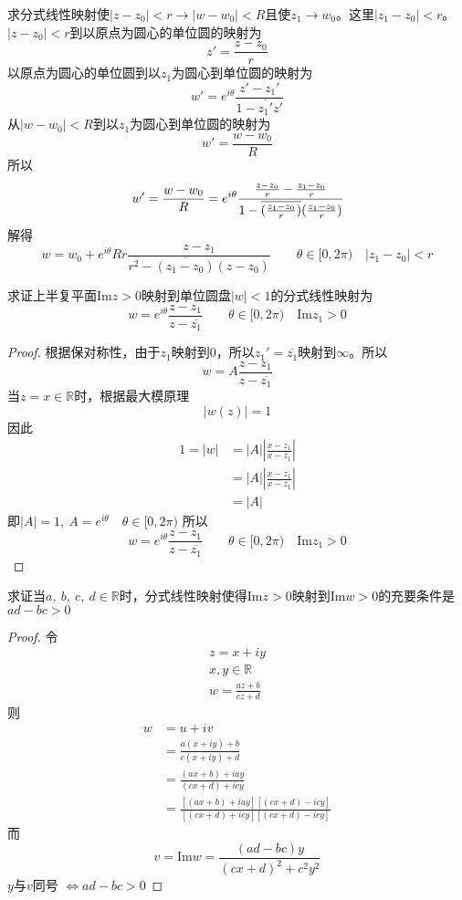 \begin{homeworkProblem}
求分式线性映射使$|z-z_0|<r\longrightarrow|w-w_0|<R$且使$z_1\rightarrow w_0$。这里$|z_1-z_0|<r$。
\newline
\solution
$|z-z_0|<r$到以原点为圆心的单位圆的映射为
\[
z' = \frac{z-z_0}{r}
\]
以原点为圆心的单位圆到以$z_1$为圆心到单位圆的映射为
\[
w' = e^{i\theta}\frac{z'-z_1'}{1-\overline{z_1'}z'}
\]
从$|w-w_0|<R$到以$z_1$为圆心到单位圆的映射为
\[
w' = \frac{w-w_0}{R}
\]
所以
\[
w' = \frac{w-w_0}{R} = e^{i\theta}\cfrac{\frac{z-z_0}{r} - \frac{z_1-z_0}{r}}
{1 - \overline{(\frac{z_1-z_0}{r})}(\frac{z_1-z_0}{r})}
\]
解得
\[
w = w_0 + e^{i\theta}Rr\frac{z-z_1}{r^2-\overline{(z_1-z_0)}(z-z_0)} \qquad \theta\in[0,2\pi)\quad|z_1-z_0|<r
\]
\end{homeworkProblem}
\begin{homeworkProblem}
求证上半复平面$\mathrm{Im}z>0$映射到单位圆盘$|w|<1$的分式线性映射为
\[
w = e^{i\theta}\frac{z-z_1}{z-\overline{z_1}}\qquad\theta\in[0,2\pi)\quad\mathrm{Im}z_1>0
\]
\begin{proof}
根据保对称性，由于$z_1$映射到$0$，所以$z_1' = \overline{z_1}$映射到$\infty$。所以
\[w=A\frac{z-z_1}{z-\overline{z_1}}\]
当$z=x\in\mathbb{R}$时，根据最大模原理\[|w(z)| = 1\]
因此
\[
\begin{split}
1 = |w| &= |A|\left|\frac{x-z_1}{x-\overline{z_1}}\right| \\
&= |A|\left|\frac{x-z_1}{\overline{x-z_1}}\right| \\
&= |A|
\end{split}
\]
即$|A|=1,~A=e^{i\theta}\quad\theta\in[0,2\pi)$
所以
\[
w = e^{i\theta}\frac{z-z_1}{z-\overline{z_1}}\qquad\theta\in[0,2\pi)\quad\mathrm{Im}z_1>0
\]
\end{proof}
\end{homeworkProblem}

\begin{homeworkProblem}
    求证当$a,~b,~c,~d\in\mathbb{R}$时，分式线性映射使得$\mathrm{Im}z>0$映射到$\mathrm{Im}w>0$的充要条件是$ad-bc>0$
\begin{proof}
    令
\begin{gather*}
z = x+iy\\
x,y\in\mathbb{R}\\
w=\frac{az+b}{cz+d}
\end{gather*}
则
\[\begin{split}
w &= u+iv \\
&= \frac{a(x+iy)+b}{c(x+iy)+d}\\
&= \frac{(ax+b)+iay}{(cx+d)+icy}\\
&= \frac{[(ax+b)+iay][(cx+d)-icy]}{[(cx+d)+icy][(cx+d)-icy]}
\end{split}\]
而
\[
v = \mathrm{Im}w = \frac{(ad-bc)y}{(cx+d)^2+c^2y^2}
\]
$y$与$v$同号
$
\Leftrightarrow ad-bc>0
$
\end{proof}
\end{homeworkProblem}

